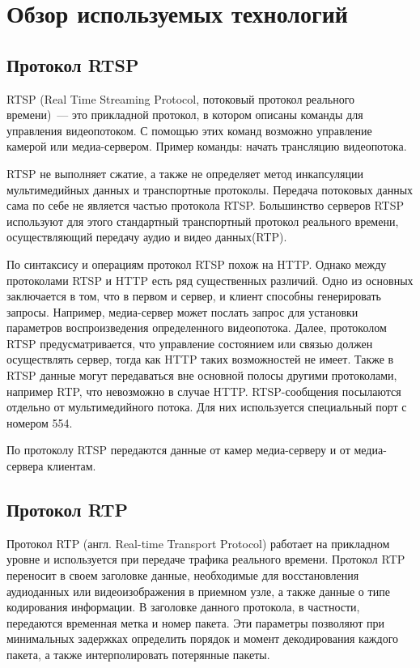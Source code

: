 \section{Обзор используемых технологий}

\subsection{Протокол RTSP}
RTSP (Real Time Streaming Protocol, потоковый протокол реального времени)~--- это прикладной протокол,
в котором описаны команды для управления видеопотоком.
С помощью этих команд возможно управление камерой или медиа-сервером.
Пример команды: начать трансляцию видеопотока.

RTSP не выполняет сжатие, а также не определяет метод инкапсуляции мультимедийных данных и
транспортные протоколы. Передача потоковых данных сама по себе не является частью протокола RTSP.
Большинство серверов RTSP используют для этого стандартный транспортный протокол реального времени,
осуществляющий передачу аудио и видео данных(RTP).

По синтаксису и операциям протокол RTSP похож на HTTP. Однако между протоколами RTSP и HTTP есть ряд
существенных различий. Одно из основных заключается в том, что в первом и сервер, и клиент способны
генерировать запросы. Например, медиа-сервер может послать запрос для установки параметров
воспроизведения определенного видеопотока. Далее, протоколом RTSP предусматривается, что управление
состоянием или связью должен осуществлять сервер, тогда как HTTP таких возможностей не имеет.
Также в RTSP данные могут передаваться вне основной полосы другими протоколами,
например RTP, что невозможно в случае HTTP. RTSP-сообщения посылаются отдельно от мультимедийного
потока. Для них используется специальный порт с номером 554.

По протоколу RTSP передаются данные от камер медиа-серверу и от медиа-сервера клиентам.

\subsection{Протокол RTP}
Протокол RTP (англ. Real-time Transport Protocol) работает на прикладном уровне и используется
при передаче трафика реального времени.
Протокол RTP переносит в своем заголовке данные, необходимые для восстановления аудиоданных или
видеоизображения в приемном узле, а также данные о типе кодирования информации. В заголовке данного
протокола, в частности, передаются временная метка и номер пакета. Эти параметры позволяют при
минимальных задержках определить порядок и момент декодирования каждого пакета, а также
интерполировать потерянные пакеты.

